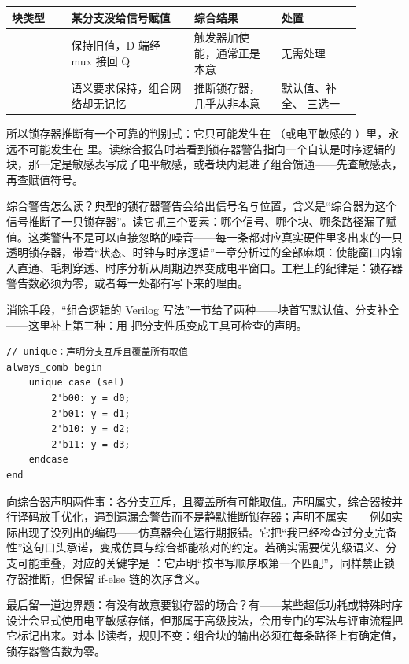 \begin{longtable}{L{0.15\linewidth}L{0.31\linewidth}L{0.22\linewidth}L{0.20\linewidth}}
\toprule
块类型 & 某分支没给信号赋值 & 综合结果 & 处置 \\
\midrule
{} & 保持旧值，D 端经 mux 接回 Q & 触发器加使能，通常正是本意 & 无需处理 \\\tablerowrule
{} & 语义要求保持，组合网络却无记忆 & 推断锁存器，几乎从非本意 & 默认值、补全、 三选一 \\
\bottomrule
\end{longtable}

所以锁存器推断有一个可靠的判别式：它只可能发生在 （或电平敏感的 ）里，永远不可能发生在  里。读综合报告时若看到锁存器警告指向一个自认是时序逻辑的块，那一定是敏感表写成了电平敏感，或者块内混进了组合馈通——先查敏感表，再查赋值符号。

综合警告怎么读？典型的锁存器警告会给出信号名与位置，含义是“综合器为这个信号推断了一只锁存器”。读它抓三个要素：哪个信号、哪个块、哪条路径漏了赋值。这类警告不是可以直接忽略的噪音——每一条都对应真实硬件里多出来的一只透明锁存器，带着“状态、时钟与时序逻辑”一章分析过的全部麻烦：使能窗口内输入直通、毛刺穿透、时序分析从周期边界变成电平窗口。工程上的纪律是：锁存器警告数必须为零，或者每一处都有写下来的理由。

消除手段，“组合逻辑的 Verilog 写法”一节给了两种——块首写默认值、分支补全——这里补上第三种：用  把分支性质变成工具可检查的声明。

\begin{lstlisting}
// unique：声明分支互斥且覆盖所有取值
always_comb begin
    unique case (sel)
        2'b00: y = d0;
        2'b01: y = d1;
        2'b10: y = d2;
        2'b11: y = d3;
    endcase
end
\end{lstlisting}

 向综合器声明两件事：各分支互斥，且覆盖所有可能取值。声明属实，综合器按并行译码放手优化，遇到遗漏会警告而不是静默推断锁存器；声明不属实——例如实际出现了没列出的编码——仿真器会在运行期报错。它把“我已经检查过分支完备性”这句口头承诺，变成仿真与综合都能核对的约定。若确实需要优先级语义、分支可能重叠，对应的关键字是 ：它声明“按书写顺序取第一个匹配”，同样禁止锁存器推断，但保留 if-else 链的次序含义。

最后留一道边界题：有没有故意要锁存器的场合？有——某些超低功耗或特殊时序设计会显式使用电平敏感存储，但那属于高级技法，会用专门的写法与评审流程把它标记出来。对本书读者，规则不变：组合块的输出必须在每条路径上有确定值，锁存器警告数为零。

